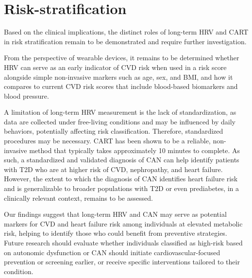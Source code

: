 \documentclass[
  a4paper,
  headsepline=true,
  open=any]{scrbook}
\begin{document}
\hypertarget{risk-stratification-1}{%
\section{Risk-stratification}\label{risk-stratification-1}}

Based on the clinical implications, the distinct roles of long-term HRV
and CART in risk stratification remain to be demonstrated and require
further investigation.

From the perspective of wearable devices, it remains to be determined
whether HRV can serve as an early indicator of CVD risk when used in a
risk score alongside simple non-invasive markers such as age, sex, and
BMI, and how it compares to current CVD risk scores that include
blood-based biomarkers and blood pressure.

A limitation of long-term HRV measurement is the lack of
standardization, as data are collected under free-living conditions and
may be influenced by daily behaviors, potentially affecting risk
classification. Therefore, standardized procedures may be necessary.
CART has been shown to be a reliable, non-invasive method that typically
takes approximately 10 minutes to complete. As such, a standardized and
validated diagnosis of CAN can help identify patients with T2D who are
at higher risk of CVD, nephropathy, and heart failure. However, the
extent to which the diagnosis of CAN identifies heart failure risk and
is generalizable to broader populations with T2D or even prediabetes, in
a clinically relevant context, remains to be assessed.

Our findings suggest that long-term HRV and CAN may serve as potential
markers for CVD and heart failure risk among individuals at elevated
metabolic risk, helping to identify those who could benefit from
preventive strategies. Future research should evaluate whether
individuals classified as high-risk based on autonomic dysfunction or
CAN should initiate cardiovascular-focused prevention or screening
earlier, or receive specific interventions tailored to their condition.
\end{document}
